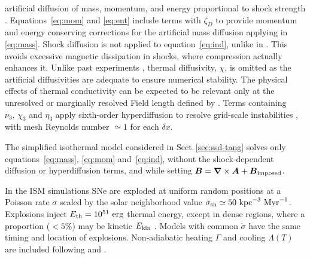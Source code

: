 \documentclass[preprint2]{aastex63}
\newcommand\SNr{\dot\sigma_{\rm sn}}
\newcommand\ESK{E_{\rm kin}}
\newcommand\EST{E_{\rm th}}
\newcommand{\vect}[1]{{{\mbox{\boldmath $#1$}}}}%
\newcommand\kpc{~ {\rm kpc}}
\newcommand\dx{ {\delta x}}
\newcommand\Myr{~ {\rm Myr}}
\newcommand\erg{~ {\rm erg}}
\newcommand{\fg}[1]{\textcolor{mypurple}{#1}}
\begin{document}
 artificial diffusion of mass, momentum, and energy proportional to shock
 strength \citep[see][for details]{GMKSH20}.
 {Equations~\eqref{eq:mom} and \eqref{eq:ent} include terms with $\zeta_D$}
 {to} {provide momentum and energy conserving corrections for} {the}
 {artificial mass diffusion applying in \eqref{eq:mass}.}
 Shock diffusion is not applied to equation~\eqref{eq:ind}{, unlike} {in}
 {\citet{Gent:2013b}.} {This avoids} {excessive magnetic dissipation in
   shocks, where compression actually enhances it.}
  {Unlike past} experiments \citep{Gent:2013b,Gent:2013a,GMKSH20},
 thermal diffusivity, $\chi$, {is omitted as} the artificial diffusivities
 are adequate to ensure numerical stability.
 {The} physical effects of thermal conductivity can be expected to be
 relevant only at the unresolved or marginally resolved Field length defined
 by \citet[][named after George Field, not the magnetic field]{BM90}.
 Terms containing $\nu_3,\,\chi_3$ and $\eta_3$ apply sixth-order hyperdiffusion
 to resolve grid-scale instabilities \citep[see, e.g.,][]{ABGS02,HB04}, \fg{
 with mesh Reynolds number $\simeq1$ for each $\dx$}.

 {The simplified isothermal model considered in
Sect.\,\ref{sec:ssd-tang} solves only equations~{\eqref{eq:mass},}
 \eqref{eq:mom} and~\eqref{eq:ind}, without the shock-dependent diffusion or
 hyperdiffusion terms, and while setting
 $\vect{B}=\vect\nabla\times\vect{A}+\vect{B}_{\rm imposed}$.}

 {In the ISM simulations} SNe are exploded at {uniform} random positions
 at a Poisson rate $\dot\sigma$ {scaled by} the solar neighborhood
 value $\SNr\simeq 50\kpc^{-3}\Myr^{-1}$.
 Explosions inject $\EST = 10^{51}\erg$ thermal energy, except in
 dense regions, where a proportion {($<5\%$) may be} kinetic $\ESK$ 
 \citep[see][]{GMKSH20}.
 {Models with common $\dot\sigma$ have the same timing and location of
 explosions.}
 Non-adiabatic heating $\Gamma$ and cooling $\Lambda (T)$ are included
 \citep{Gent:2013b} following \citet{Wolfire:1995} and \citet{Sarazin:1987}.
\end{document}
